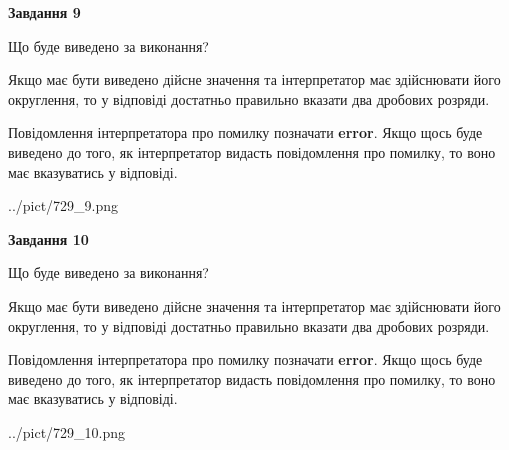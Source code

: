 \documentclass[12pt, ukrainian]{article}
\begin{document}
{\begin {Large}
{\begin {center}\textbf{Завдання 9}\end {center}}\par
Що буде виведено за виконання? \par

Якщо має бути виведено дійсне значення та інтерпретатор має здійснювати його округлення, 
то у відповіді достатньо правильно вказати два дробових розряди.

Повідомлення інтерпретатора про помилку позначати \textbf{error}.
Якщо щось буде виведено до того, як інтерпретатор видасть повідомлення про помилку, 
то воно має вказуватись у відповіді. \par

\begin{center}
	{../pict/729_9.png}
\end{center}
\newpage

{\begin {center}\textbf{Завдання 10}\end {center}}\par
Що буде виведено за виконання? \par

Якщо має бути виведено дійсне значення та інтерпретатор має здійснювати його округлення, 
то у відповіді достатньо правильно вказати два дробових розряди.

Повідомлення інтерпретатора про помилку позначати \textbf{error}.
Якщо щось буде виведено до того, як інтерпретатор видасть повідомлення про помилку, 
то воно має вказуватись у відповіді. \par

\begin{center}
	{../pict/729_10.png}
\end{center}
\newpage

\end {Large}}
\end{document}
